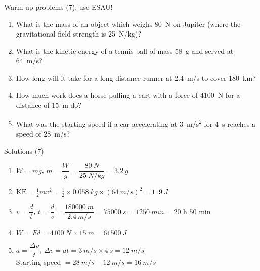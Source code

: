 \documentclass[14pt]{beamer}
\begin{document}
\begin{frame}{Warm up problems (7): use ESAU!}
\vspace*{-0.8em}\begin{enumerate}
\item\label{8.2} What is the mass of an object which weighs \SI{80}{N} on Jupiter (where the gravitational field strength is \SI{25}{N/kg})?
\item\label{6.1} What is the kinetic energy of a tennis ball of mass \SI{58}{g} and served at \SI{64}{m/s}?
\item\label{1.3} How long will it take for a long distance runner at \SI{2.4}{m/s} to cover \SI{180}{km}?
\item\label{5.1} How much work does a horse pulling a cart with a force of \SI{4100}{N} for a distance of \SI{15}{m} do?
\item\label{3.3} What was the starting speed if a car accelerating at \SI{3}{m/s^2} for \SI{4}{s} reaches a speed of \SI{28}{m/s}?
\end{enumerate}
\end{frame}

\begin{frame}{Solutions (7)}
\vspace*{-0.8em}\begin{enumerate}
\item\label{8.2} $W=mg$, $m = \dfrac{W}{g}=\dfrac{\SI{80}{N}}{\SI{25}{N/kg}}=\SI{3.2}{g}$
\item\label{6.1} $\text{KE}=\frac{1}{2}mv^2=\frac{1}{2}\times\SI{0.058}{kg}\times(\SI{64}{m/s})^2=\SI{119}{J}$
\item\label{1.3} $v=\dfrac{d}{t}$, $t=\dfrac{d}{v}=\dfrac{\SI{180000}{m}}{\SI{2.4}{m/s}}=\SI{75000}{s}=\SI{1250}{min}=\text{20 h 50 min}$
\item\label{5.1} $W=Fd=\SI{4100}{N}\times\SI{15}{m}=\SI{61500}{J}$
\item\label{3.3} $a=\dfrac{\Delta v}{t}$, $\Delta v = at = \SI{3}{m/s}\times\SI{4}{s}=\SI{12}{m/s}$\\
Starting speed $=\SI{28}{m/s}-\SI{12}{m/s}=\SI{16}{m/s}$
\end{enumerate}
\end{frame}
\end{document}
